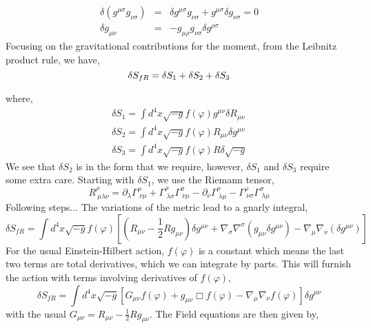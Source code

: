 \begin{eqnarray}
    \delta(g^{\mu\sigma}g_{\nu\sigma}) &=& \delta g^{\mu\sigma}g_{\nu\sigma} + g^{\mu\sigma}\delta g_{\nu\sigma}= 0 \nonumber\\
    \delta g_{\mu\nu} &=& -g_{\mu\rho}g_{\nu\sigma}\delta g^{\rho\sigma}
\end{eqnarray}
Focusing on the gravitational contributions for the moment, from the Leibnitz product rule, we have,
\begin{equation}
    \delta S_{fR} = \delta S_1 + \delta S_2 + \delta S_3\\
\end{equation}

where,
\begin{eqnarray}
    \delta S_1 = \int d^4 x \sqrt{-g} f(\varphi) g^{\mu\nu}\delta R_{\mu\nu}\\
    \delta S_2 = \int d^4 x \sqrt{-g} f(\varphi) R_{\mu\nu} \delta g^{\mu\nu}\\
    \delta S_3 = \int d^4 x \sqrt{-g} f(\varphi) R\delta\sqrt{-g}
\end{eqnarray}
We see that $\delta S_2$ is in the form that we require, however, $\delta S_1$ and $\delta S_3$ require some extra care. Starting with $\delta S_1$, we use the Riemann tensor, 
\begin{equation}
    R^{\rho}_{\ \mu \lambda \nu} = \partial_{\lambda}\Gamma^{\rho}_{\ \nu \mu} + \Gamma^{\rho}_{\ \lambda \sigma} \Gamma^{\sigma}_{\ \nu\mu} - \partial_{\nu}\Gamma^{\rho}_{\ \lambda \mu} - \Gamma^{\rho}_{\ \nu \sigma} \Gamma^{\sigma}_{\ \lambda\mu}
\end{equation}
Following steps...
The variations of the metric lead to a gnarly integral, 
\begin{equation}
    \delta S_{fR} = \int d^4x\sqrt{-g}f(\varphi)\left[\left(R_{\mu\nu}- \frac{1}{2} Rg_{\mu\nu}\right)\delta g^{\mu\nu} + \nabla_{\sigma}\nabla^{\sigma}(g_{\mu\nu}\delta g^{\mu\nu}) - \nabla_{\mu}\nabla_{\nu}(\delta g^{\mu\nu})\right]
\end{equation}
For the usual Einstein-Hilbert action, $f(\varphi)$ is a constant which means the last two terms are total derivatives, which we can integrate by parts. This will furnish the action with terms involving derivatives of $f(\varphi)$,
\begin{equation}
    \delta S_{fR} = \int d^4x\sqrt{-g}\left[G_{\mu\nu}f(\varphi) + g_{\mu\nu}\Box f(\varphi)  - \nabla_{\mu}\nabla_{\nu}f(\varphi)\right]\delta g^{\mu\nu}
\end{equation}
with the usual $G_{\mu\nu} = R_{\mu\nu}- \frac{1}{2} Rg_{\mu\nu}$. The Field equations are then given by, 
